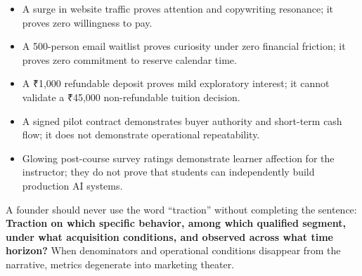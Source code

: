 \begin{itemize}
    \item A surge in website traffic proves attention and copywriting resonance; it proves zero willingness to pay.
    \item A 500-person email waitlist proves curiosity under zero financial friction; it proves zero commitment to reserve calendar time.
    \item A ₹1,000 refundable deposit proves mild exploratory interest; it cannot validate a ₹45,000 non-refundable tuition decision.
    \item A signed pilot contract demonstrates buyer authority and short-term cash flow; it does not demonstrate operational repeatability.
    \item Glowing post-course survey ratings demonstrate learner affection for the instructor; they do not prove that students can independently build production AI systems.
\end{itemize}

A founder should never use the word ``traction'' without completing the sentence: \textbf{Traction on which specific behavior, among which qualified segment, under what acquisition conditions, and observed across what time horizon?} When denominators and operational conditions disappear from the narrative, metrics degenerate into marketing theater.
